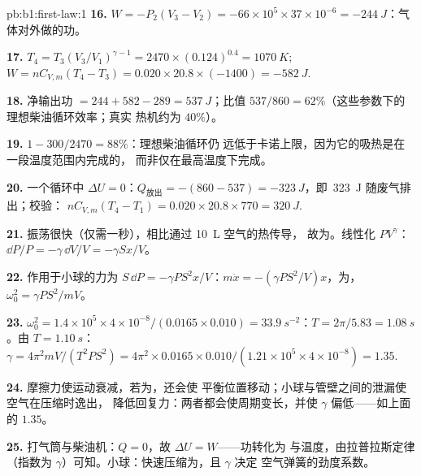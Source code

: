 \begin{solution}{pb:b1:first-law:1}
\textbf{16.} $W = -P_2(V_3 - V_2) = -66\times10^5 \times 37\times10^{-6} =
\qty{-244}{J}$：气体对外做的功。

\textbf{17.} $T_4 = T_3(V_3/V_1)^{\gamma - 1} = 2470 \times (0.124)^{0.4} =
\qty{1070}{K}$; $W = nC_{V,m}(T_4 - T_3) = 0.020 \times 20.8 \times (-1400) =
\qty{-582}{J}$.

\textbf{18.} 净输出功 $= 244 + 582 - 289 = \qty{537}{J}$；比值
$537/860 = 62\%$（这些参数下的理想柴油循环效率；真实
热机约为 $40\%$）。

\textbf{19.} $1 - 300/2470 = 88\%$：理想柴油循环仍
远低于卡诺上限，因为它的吸热是在一段温度范围内完成的，
而非仅在最高温度下完成。

\textbf{20.} 一个循环中 $\Delta U = 0$：$Q_{\text{放出}} = -(860 - 537) =
\qty{-323}{J}$，即\ \qty{323}{J} 随废气排出；校验：
$nC_{V,m}(T_4 - T_1) = 0.020 \times 20.8 \times 770 = \qty{320}{J}$.

\textbf{21.} 振荡很快（仅需一秒），相比通过 \qty{10}{L} 空气的热传导，
故为。线性化
$PV^\gamma$：$\dd P/P = -\gamma\,\dd V/V = -\gamma Sx/V$。

\textbf{22.} 作用于小球的力为 $S\,\dd P = -\gamma PS^2x/V$：$m\ddot x =
-(\gamma PS^2/V)x$，为，$\omega_0^2 = \gamma PS^2/mV$。

\textbf{23.} $\omega_0^2 = 1.4 \times 10^5 \times 4\times10^{-8}/(0.0165 \times 0.010)
= \qty{33.9}{s^{-2}}$：$T = 2\pi/5.83 = \qty{1.08}{s}$。由 $T = \qty{1.10}{s}$：
$\gamma = 4\pi^2mV/(T^2PS^2) = 4\pi^2 \times 0.0165 \times 0.010/(1.21 \times 10^5
\times 4\times10^{-8}) = 1.35$.

\textbf{24.} 摩擦力使运动衰减，若为，还会使
平衡位置移动；小球与管壁之间的泄漏使空气在压缩时逸出，
降低回复力：两者都会使周期变长，并使
$\gamma$ 偏低——如上面的 $1.35$。

\textbf{25.} 打气筒与柴油机：$Q = 0$，故 $\Delta U = W$——功转化为
与温度，由拉普拉斯定律（指数为
$\gamma$）可知。小球：快速压缩为，且 $\gamma$ 决定
空气弹簧的劲度系数。
\end{solution}
